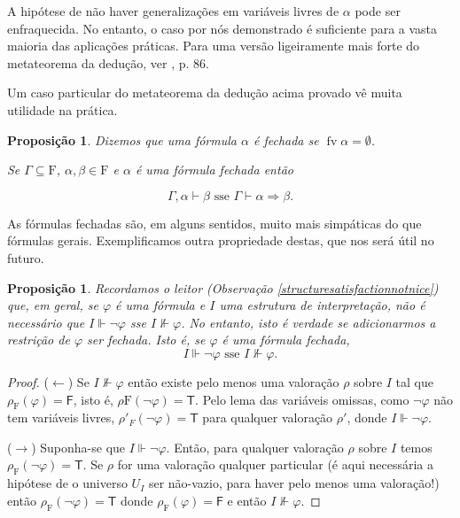 \documentclass{report}
\newtheorem{prop}{Proposição}
\newtheorem*{prop*}{Proposição}
\theoremstyle{definition}
\theoremstyle{remark}
\newcommand{\F}{\mathrm{F}}
\newcommand{\lt}{\mathsf{T}}
\newcommand{\lf}{\mathsf{F}}
\DeclareMathOperator{\fv}{fv}
\newcommand{\imply}{\mathbin{\Rightarrow}}
\begin{document}
	A hipótese de não haver generalizações em variáveis livres de $\alpha$ pode ser enfraquecida. No entanto, o caso por nós demonstrado é suficiente para a vasta maioria das aplicações práticas. Para uma versão ligeiramente mais forte do metateorema da dedução, ver \cite{fltc}, p. 86.
	
	Um caso particular do metateorema da dedução acima provado vê muita utilidade na prática.
	
	\begin{prop*}
	Dizemos que uma fórmula $\alpha$ é \emph{fechada} se $\fv \alpha = \emptyset$.
	
	Se $\Gamma \subseteq \F$, $\alpha, \beta \in \F$ e $\alpha$ é uma fórmula fechada então
	
	\[\Gamma, \alpha \vdash \beta \text{ sse } \Gamma \vdash \alpha \imply \beta.\]
	\end{prop*}
	
	As fórmulas fechadas são, em alguns sentidos, muito mais simpáticas do que fórmulas gerais. Exemplificamos outra propriedade destas, que nos será útil no futuro.
	
	\begin{prop}\label{fol:closednegnvdash}
	Recordamos o leitor (Observação \ref{structuresatisfactionnotnice}) que, em geral, se $\varphi$ é uma fórmula e $I$ uma estrutura de interpretação, não é necessário que $I \Vdash \neg \varphi$ sse $I \nVdash \varphi$. No entanto, isto é verdade se adicionarmos a restrição de $\varphi$ ser fechada. Isto é, se $\varphi$ é uma fórmula fechada,
	\[I \Vdash \neg \varphi \text{ sse } I \nVdash \varphi.\]
	\end{prop}
	
	\begin{proof}
	($\leftarrow$) Se $I \nVdash \varphi$ então existe pelo menos uma valoração $\rho$ sobre $I$ tal que $\rho_\F(\varphi) = \lf$, isto é, $\rho\F(\neg \varphi) = \lt$. Pelo lema das variáveis omissas, como $\neg \varphi$ não tem variáveis livres, $\rho'_F(\neg \varphi) = \lt$ para qualquer valoração $\rho'$, donde $I \Vdash \neg \varphi$.
	
	($\rightarrow$) Suponha-se que $I \Vdash \neg \varphi$. Então, para qualquer valoração $\rho$ sobre $I$ temos $\rho_\F(\neg \varphi) = \lt$. Se $\rho$ for uma valoração qualquer particular (é aqui necessária a hipótese de o universo $U_I$ ser não-vazio, para haver pelo menos uma valoração!) então $\rho_\F(\neg \varphi) = \lt$ donde $\rho_\F(\varphi) = \lf$ e então $I \nVdash \varphi$.
	\end{proof}
\end{document}
